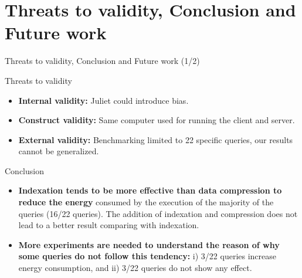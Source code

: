 \documentclass{beamer}
\begin{document}
\section{Threats to validity, Conclusion and Future work}
\begin{frame}{Threats to validity, Conclusion and Future work (1/2)}

\begin{block} {Threats to validity}
         \begin{itemize}
             \small
             \item \textbf{Internal validity:} Juliet could introduce bias.
             \item \textbf{Construct validity:} Same computer used for running the client and server.
             \item \textbf{External validity:} Benchmarking limited to 22 specific queries, our results cannot be generalized.
         \end{itemize}
\end{block}

\begin{exampleblock} {Conclusion}
         \begin{itemize}
             \small
             \item \textbf{Indexation tends to be more effective than data compression to reduce the energy} consumed by the execution of the majority of the queries (16/22 queries). The addition of indexation and compression does not lead to a better result comparing with indexation.
             \item \textbf{More experiments are needed to understand the reason of why some queries do not follow this tendency:} i) 3/22 queries increase energy consumption, and ii) 3/22 queries do not show any effect.  

         \end{itemize}
\end{exampleblock}

\end{frame}
\end{document}

